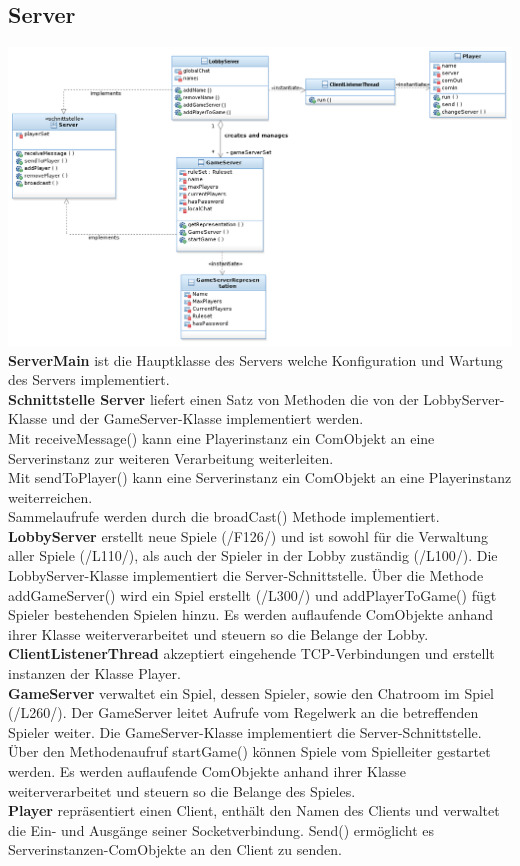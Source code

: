 \documentclass{article}
\begin{document}
\subsection{Server}
\includegraphics[width=\textwidth]{Server}
\textbf{ServerMain} ist die Hauptklasse des Servers welche Konfiguration und Wartung des Servers implementiert. \\
		\textbf{Schnittstelle Server} liefert einen Satz von Methoden die von der LobbyServer-Klasse und der GameServer-Klasse implementiert werden. \\
		Mit receiveMessage() kann eine Playerinstanz ein ComObjekt an eine Serverinstanz zur weiteren Verarbeitung weiterleiten. \\
		Mit sendToPlayer() kann eine Serverinstanz ein ComObjekt an eine Playerinstanz weiterreichen. \\
		Sammelaufrufe werden durch die broadCast() Methode implementiert.
		\textbf{LobbyServer} erstellt neue Spiele (/F126/) und ist sowohl für die Verwaltung aller Spiele (/L110/), als auch der Spieler in der Lobby zuständig (/L100/). Die LobbyServer-Klasse implementiert die Server-Schnittstelle. Über die Methode addGameServer() wird ein Spiel erstellt (/L300/) und addPlayerToGame() fügt Spieler bestehenden Spielen hinzu. Es werden auflaufende ComObjekte anhand ihrer Klasse weiterverarbeitet und steuern so die Belange der Lobby. \\
		\textbf{ClientListenerThread} akzeptiert eingehende TCP-Verbindungen und erstellt instanzen der Klasse Player. \\
		\textbf{GameServer} verwaltet ein Spiel, dessen Spieler, sowie den Chatroom im Spiel (/L260/). Der GameServer leitet Aufrufe vom Regelwerk an die betreffenden Spieler weiter. Die GameServer-Klasse implementiert die Server-Schnittstelle. Über den Methodenaufruf startGame() können Spiele vom Spielleiter gestartet werden. Es werden auflaufende ComObjekte anhand ihrer Klasse weiterverarbeitet und steuern so die Belange des Spieles.\\
		\textbf{Player} repräsentiert einen Client, enthält den Namen des Clients und verwaltet die Ein- und Ausgänge seiner Socketverbindung. Send() ermöglicht es Serverinstanzen-ComObjekte an den Client zu senden. \\
\end{document}
